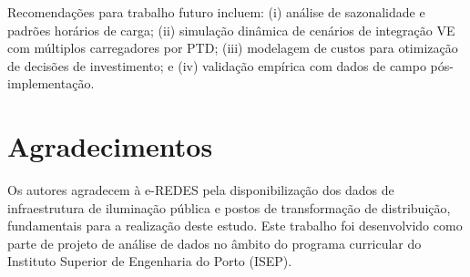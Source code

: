 \documentclass[conference]{IEEEtran}
\begin{document}
Recomendações para trabalho futuro incluem: (i) análise de sazonalidade e padrões horários de carga; (ii) simulação dinâmica de cenários de integração VE com múltiplos carregadores por PTD; (iii) modelagem de custos para otimização de decisões de investimento; e (iv) validação empírica com dados de campo pós-implementação.

\section*{Agradecimentos}

Os autores agradecem à e-REDES pela disponibilização dos dados de infraestrutura de iluminação pública e postos de transformação de distribuição, fundamentais para a realização deste estudo. Este trabalho foi desenvolvido como parte de projeto de análise de dados no âmbito do programa curricular do Instituto Superior de Engenharia do Porto (ISEP).
\end{document}
